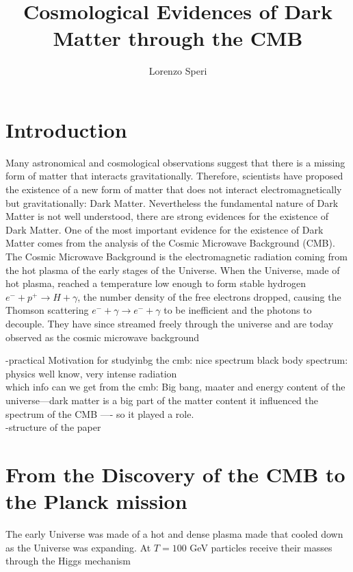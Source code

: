 \documentclass{article}
\title{Cosmological Evidences of Dark Matter through the CMB}
\author{Lorenzo Speri}
\date{}
\begin{document}
\maketitle


\section{Introduction}
Many astronomical and cosmological observations suggest that there is a missing form of matter that interacts gravitationally. 
Therefore, scientists have proposed the existence of a new form of matter that does not interact electromagnetically but gravitationally: Dark Matter.
Nevertheless the fundamental nature of Dark Matter is not well understood, there are strong evidences for the existence of Dark Matter. 
One of the most important evidence for the existence of Dark Matter comes from the analysis of the Cosmic Microwave Background (CMB). \\
The Cosmic Microwave Background is the electromagnetic radiation coming from the hot plasma of the early stages of the Universe.
When the Universe, made of hot plasma, reached a temperature low enough to form stable hydrogen $e^- + p^+  \rightarrow H + \gamma$, the number density of the free electrons dropped, causing the Thomson scattering $e^- + \gamma  \rightarrow e^- + \gamma$ to be inefficient and the photons to decouple. They have since streamed freely through the universe and are today observed as the cosmic microwave background \citep{LecturesPdf}



-practical Motivation for studyinbg the cmb: nice spectrum black body spectrum: physics well know, very intense radiation\\
which info can we get from the cmb: Big bang, maater and energy content of the universe---dark matter is a big part of the matter content it influenced the spectrum  of the CMB ---- so it played a role.\\
-structure of the paper \\




\section{From the Discovery of the CMB to the Planck mission}
The early Universe was made of a hot and dense plasma made that cooled down as the Universe was expanding. At $T= 100$ GeV  particles receive their masses through the Higgs mechanism
\end{document}
